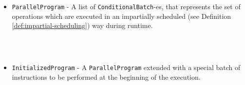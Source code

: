 \begin{itemize}
    \item \verb|ParallelProgram| - A list of \verb|ConditionalBatch|-es, that represents the set of operations which are executed in an impartially scheduled (see Definition \ref{def:impartial-scheduling}) way during runtime.
    \begin{code}
        \>[2]\AgdaSpace{}%
        \AgdaSymbol{:}\AgdaSpace{}%
        \<%
        \\
        \>[2]\AgdaSpace{}%
        \AgdaSymbol{=}\AgdaSpace{}%
        \AgdaSpace{}%
        \<%
        \\
        \>[2]\AgdaSpace{}%
        \AgdaSymbol{=}\AgdaSpace{}%
        \AgdaSymbol{(}\AgdaSpace{}%
        \AgdaSpace{}%
        \AgdaSymbol{)}\<%
    \end{code}
    
    \item \verb|InitializedProgram| - A \verb|ParallelProgram| extended with a special batch of instructions to be performed at the beginning of the execution.
    \begin{code}
        \>[2]\AgdaSpace{}%
        \AgdaSymbol{:}\AgdaSpace{}%
        \<%
        \\
        \>[2]\AgdaSpace{}%
        \AgdaSymbol{=}\AgdaSpace{}%
        \AgdaSymbol{(}\AgdaSpace{}%
        \AgdaSpace{}%
        \AgdaSymbol{)}\<%
    \end{code}
    
\end{itemize}

